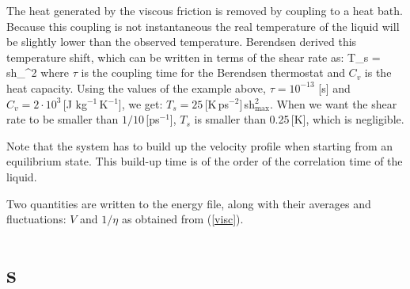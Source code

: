 The heat generated by the viscous friction is removed by coupling to a heat
bath. Because this coupling is not instantaneous the real temperature of the
liquid will be slightly lower than the observed temperature.
Berendsen derived this temperature shift\cite{Berendsen91}{,} which can
be written in terms of the shear rate as:
\beq
T_s =  \mbox{sh}_{\max}^2
\eeq
where $\tau$ is the coupling time for the Berendsen thermostat and
$C_v$ is the heat capacity. Using the values of the example above,
$\tau=10^{-13}$ [s] and $C_v=2 \cdot 10^3$\,[J kg$^{-1}$\,K$^{-1}$], we
get: $T_s=25$\,[K\,ps$^{-2}$]\,sh$_{\max}^2$. When we want the shear
rate to be smaller than $1/10$\,[ps$^{-1}$], $T_s$ is smaller than
0.25\,[K], which is negligible.

Note that the system has to build up the velocity profile when starting
from an equilibrium state. This build-up time is of the order of the
correlation time of the liquid.

Two quantities are written to the energy file, along with their averages
and fluctuations: $V$ and $1/\eta$ as obtained from (\ref{visc}).

\section{s}
